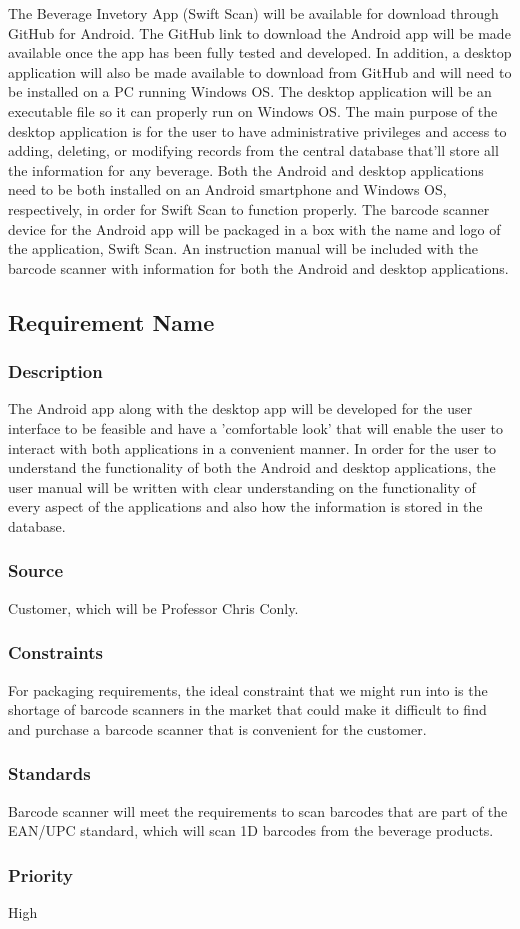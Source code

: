 The Beverage Invetory App (Swift Scan) will be available for download through GitHub for Android.  The GitHub link to download the Android app will be made available once the app has been fully tested and developed.  In addition, a desktop application will also be made available to download from GitHub and will need to be installed on a PC running Windows OS.  The desktop application will be an executable file so it can properly run on Windows OS.  The main purpose of the desktop application is for the user to have administrative privileges and access to adding, deleting, or modifying records from the central database that'll store all the information for any beverage.  Both the Android and desktop applications need to be both installed on an Android smartphone and Windows OS, respectively, in order for Swift Scan to function properly.  The barcode scanner device for the Android app will be packaged in a box with the name and logo of the application, Swift Scan.  An instruction manual will be included with the barcode scanner with information for both the Android and desktop applications.

\subsection{Requirement Name}
\subsubsection{Description}
The Android app along with the desktop app will be developed for the user interface to be feasible and have a 'comfortable look' that will enable the user to interact with both applications in a convenient manner.  In order for the user to understand the functionality of both the Android and desktop applications, the user manual will be written with clear understanding on the functionality of every aspect of the applications and also how the information is stored in the database. 
\subsubsection{Source}
Customer, which will be Professor Chris Conly.
\subsubsection{Constraints}
For packaging requirements, the ideal constraint that we might run into is the shortage of barcode scanners in the market that could make it difficult to find and purchase a barcode scanner that is convenient for the customer.
\subsubsection{Standards}
Barcode scanner will meet the requirements to scan barcodes that are part of the EAN/UPC standard, which will scan 1D barcodes from the beverage products.
\subsubsection{Priority}
High
